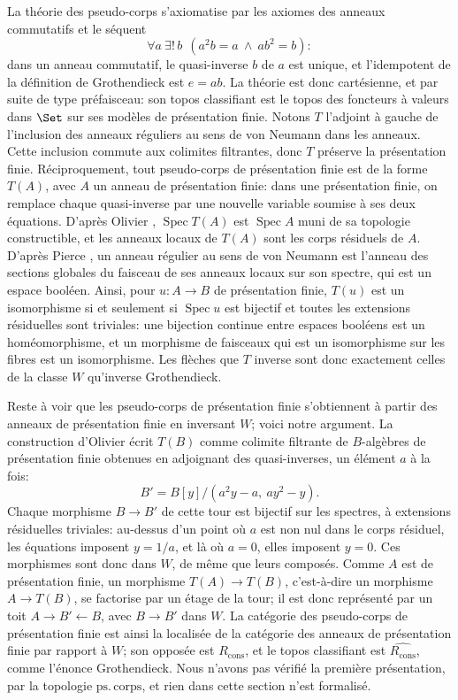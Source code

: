 La théorie des pseudo-corps s'axiomatise par les axiomes des anneaux commutatifs et le séquent
\[
\forall a\ \exists!\,b\ \ (a^2b = a\ \wedge\ ab^2 = b):
\]
dans un anneau commutatif, le quasi-inverse $b$ de $a$ est unique, et l'idempotent de la définition de Grothendieck est $e = ab$. La théorie est donc cartésienne, et par suite de type préfaisceau: son topos classifiant est le topos des foncteurs à valeurs dans $\Set$ sur ses modèles de présentation finie. Notons $T$ l'adjoint à gauche de l'inclusion des anneaux réguliers au sens de von Neumann dans les anneaux. Cette inclusion commute aux colimites filtrantes, donc $T$ préserve la présentation finie. Réciproquement, tout pseudo-corps de présentation finie est de la forme $T(A)$, avec $A$ un anneau de présentation finie: dans une présentation finie, on remplace chaque quasi-inverse par une nouvelle variable soumise à ses deux équations. D'après Olivier \cite{olivier}, $\operatorname{Spec}T(A)$ est $\operatorname{Spec}A$ muni de sa topologie constructible, et les anneaux locaux de $T(A)$ sont les corps résiduels de $A$. D'après Pierce \cite{pierce}, un anneau régulier au sens de von Neumann est l'anneau des sections globales du faisceau de ses anneaux locaux sur son spectre, qui est un espace booléen. Ainsi, pour $u:A\to B$ de présentation finie, $T(u)$ est un isomorphisme si et seulement si $\operatorname{Spec}u$ est bijectif et toutes les extensions résiduelles sont triviales: une bijection continue entre espaces booléens est un homéomorphisme, et un morphisme de faisceaux qui est un isomorphisme sur les fibres est un isomorphisme. Les flèches que $T$ inverse sont donc exactement celles de la classe $W$ qu'inverse Grothendieck.

Reste à voir que les pseudo-corps de présentation finie s'obtiennent à partir des anneaux de présentation finie en inversant $W$; voici notre argument. La construction d'Olivier écrit $T(B)$ comme colimite filtrante de $B$-algèbres de présentation finie obtenues en adjoignant des quasi-inverses, un élément $a$ à la fois:
\[
B' = B[y]/(a^2y - a,\ ay^2 - y).
\]
Chaque morphisme $B\to B'$ de cette tour est bijectif sur les spectres, à extensions résiduelles triviales: au-dessus d'un point où $a$ est non nul dans le corps résiduel, les équations imposent $y = 1/a$, et là où $a = 0$, elles imposent $y = 0$. Ces morphismes sont donc dans $W$, de même que leurs composés. Comme $A$ est de présentation finie, un morphisme $T(A)\to T(B)$, c'est-à-dire un morphisme $A\to T(B)$, se factorise par un étage de la tour; il est donc représenté par un toit $A\to B'\leftarrow B$, avec $B\to B'$ dans $W$. La catégorie des pseudo-corps de présentation finie est ainsi la localisée de la catégorie des anneaux de présentation finie par rapport à $W$; son opposée est $R_{\mathrm{cons}}$, et le topos classifiant est $\widehat{R_{\mathrm{cons}}}$, comme l'énonce Grothendieck. Nous n'avons pas vérifié la première présentation, par la topologie $\mathrm{ps.\,corps}$, et rien dans cette section n'est formalisé.

